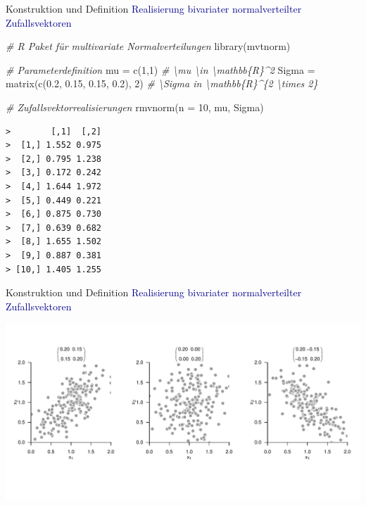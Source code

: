 \documentclass[
  8pt,
  ignorenonframetext,
]{beamer}
\newenvironment{Shaded}{\begin{snugshade}}{\end{snugshade}}
\newcommand{\AttributeTok}[1]{\textcolor[rgb]{0.77,0.63,0.00}{#1}}
\newcommand{\CommentTok}[1]{\textcolor[rgb]{0.56,0.35,0.01}{\textit{#1}}}
\newcommand{\DecValTok}[1]{\textcolor[rgb]{0.00,0.00,0.81}{#1}}
\newcommand{\FloatTok}[1]{\textcolor[rgb]{0.00,0.00,0.81}{#1}}
\newcommand{\FunctionTok}[1]{\textcolor[rgb]{0.00,0.00,0.00}{#1}}
\newcommand{\NormalTok}[1]{#1}
\newcommand{\OtherTok}[1]{\textcolor[rgb]{0.56,0.35,0.01}{#1}}
\begin{document}
\begin{frame}[fragile]{Konstruktion und Definition}
\protect\hypertarget{konstruktion-und-definition-8}{}
\textcolor{darkblue}{Realisierung bivariater normalverteilter Zufallsvektoren}
\footnotesize {} \vspace{1mm}

\begin{Shaded}
\begin{Highlighting}[]
\CommentTok{\# R Paket für multivariate Normalverteilungen}
\FunctionTok{library}\NormalTok{(mvtnorm)}

\CommentTok{\# Parameterdefinition}
\NormalTok{mu     }\OtherTok{=} \FunctionTok{c}\NormalTok{(}\DecValTok{1}\NormalTok{,}\DecValTok{1}\NormalTok{)                                }\CommentTok{\# \textbackslash{}mu \textbackslash{}in \textbackslash{}mathbb\{R\}\^{}2}
\NormalTok{Sigma  }\OtherTok{=} \FunctionTok{matrix}\NormalTok{(}\FunctionTok{c}\NormalTok{(}\FloatTok{0.2}\NormalTok{,  }\FloatTok{0.15}\NormalTok{,  }\FloatTok{0.15}\NormalTok{, }\FloatTok{0.2}\NormalTok{), }\DecValTok{2}\NormalTok{)  }\CommentTok{\# \textbackslash{}Sigma in \textbackslash{}mathbb\{R\}\^{}\{2 \textbackslash{}times 2\}}

\CommentTok{\# Zufallsvektorrealisierungen}
\FunctionTok{rmvnorm}\NormalTok{(}\AttributeTok{n =} \DecValTok{10}\NormalTok{, mu, Sigma)}
\end{Highlighting}
\end{Shaded}

\begin{verbatim}
>        [,1]  [,2]
>  [1,] 1.552 0.975
>  [2,] 0.795 1.238
>  [3,] 0.172 0.242
>  [4,] 1.644 1.972
>  [5,] 0.449 0.221
>  [6,] 0.875 0.730
>  [7,] 0.639 0.682
>  [8,] 1.655 1.502
>  [9,] 0.887 0.381
> [10,] 1.405 1.255
\end{verbatim}
\end{frame}

\begin{frame}{Konstruktion und Definition}
\protect\hypertarget{konstruktion-und-definition-9}{}
\textcolor{darkblue}{Realisierung bivariater normalverteilter Zufallsvektoren}
\vspace{2mm}

\begin{center}\includegraphics[width=1\linewidth]{6_Abbildungen/mvda_6_rmvnorm} \end{center}
\end{frame}
\end{document}
